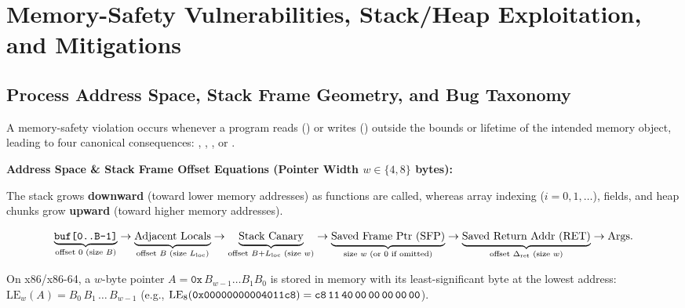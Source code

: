 \section{Memory-Safety Vulnerabilities, Stack/Heap Exploitation, and Mitigations}

\subsection{Process Address Space, Stack Frame Geometry, and Bug Taxonomy}
A memory-safety violation occurs whenever a program reads () or writes () outside the bounds or lifetime of the intended memory object, leading to four canonical consequences: , , , or .

\textbf{Address Space \& Stack Frame Offset Equations (Pointer Width $w \in \{4, 8\}$ bytes):}
\begin{compactitem}
  \item {} The stack grows \textbf{downward} (toward lower memory addresses) as functions are called, whereas array indexing  ($i = 0, 1, \dots$),  fields, and heap chunks grow \textbf{upward} (toward higher memory addresses).
  \item {}
  \[
    \underbrace{\texttt{buf[0..B-1]}}_{\text{offset } 0 \text{ (size } B\text{)}} \to
    \underbrace{\text{Adjacent Locals}}_{\text{offset } B \text{ (size } L_{\text{loc}}\text{)}} \to
    \underbrace{\text{Stack Canary}}_{\text{offset } B + L_{\text{loc}} \text{ (size } w\text{)}} \to
    \underbrace{\text{Saved Frame Ptr (SFP)}}_{\text{size } w \text{ (or } 0 \text{ if omitted)}} \to
    \underbrace{\text{Saved Return Addr (RET)}}_{\text{offset } \Delta_{\text{ret}} \text{ (size } w\text{)}} \to
    \text{Args}.
  \]
  \item {} On x86/x86-64, a $w$-byte pointer $A = \texttt{0x}\,B_{w-1}\dots B_1 B_0$ is stored in memory with its least-significant byte at the lowest address: $\mathrm{LE}_w(A) = B_0 \, B_1 \, \dots \, B_{w-1}$ (e.g., $\mathrm{LE}_8(\texttt{0x00000000004011c8}) = \texttt{c8\,11\,40\,00\,00\,00\,00\,00}$).
\end{compactitem}


